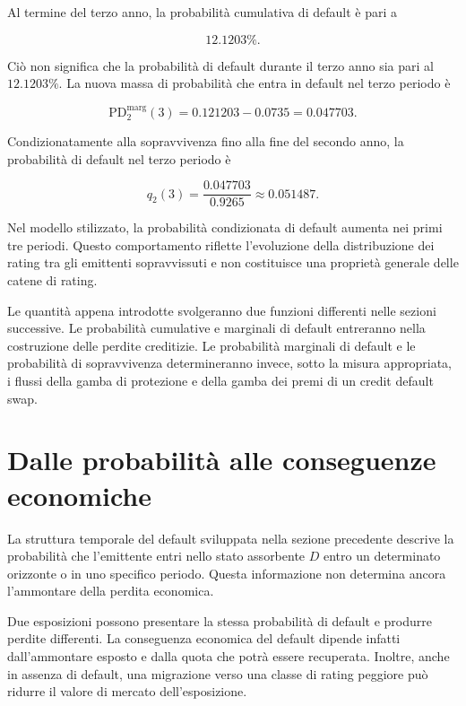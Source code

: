 Al termine del terzo anno, la probabilit\`{a} cumulativa di default
\`{e} pari a

\[
12.1203\%.
\]

Ci\`{o} non significa che la probabilit\`{a} di default durante il
terzo anno sia pari al $12.1203\%$. La nuova massa di probabilit\`{a}
che entra in default nel terzo periodo \`{e}

\[
\mathrm{PD}_{2}^{\mathrm{marg}}(3)
=
0.121203-0.0735
=
0.047703.
\]

Condizionatamente alla sopravvivenza fino alla fine del secondo anno,
la probabilit\`{a} di default nel terzo periodo \`{e}

\[
q_2(3)
=
\frac{0.047703}{0.9265}
\approx
0.051487.
\]

Nel modello stilizzato, la probabilit\`{a} condizionata di default
aumenta nei primi tre periodi. Questo comportamento riflette
l'evoluzione della distribuzione dei rating tra gli emittenti
sopravvissuti e non costituisce una propriet\`{a} generale delle
catene di rating.

Le quantit\`{a} appena introdotte svolgeranno due funzioni differenti
nelle sezioni successive. Le probabilit\`{a} cumulative e marginali di
default entreranno nella costruzione delle perdite creditizie. Le
probabilit\`{a} marginali di default e le probabilit\`{a} di
sopravvivenza determineranno invece, sotto la misura appropriata, i
flussi della gamba di protezione e della gamba dei premi di un credit
default swap.

\section{Dalle probabilit\`{a} alle conseguenze economiche}

\label{sec:cap9-conseguenze-economiche}

La struttura temporale del default sviluppata nella sezione precedente
descrive la probabilit\`{a} che l'emittente entri nello stato
assorbente $D$ entro un determinato orizzonte o in uno specifico
periodo. Questa informazione non determina ancora l'ammontare della
perdita economica.

Due esposizioni possono presentare la stessa probabilit\`{a} di
default e produrre perdite differenti. La conseguenza economica del
default dipende infatti dall'ammontare esposto e dalla quota che
potr\`{a} essere recuperata. Inoltre, anche in assenza di default, una
migrazione verso una classe di rating peggiore pu\`{o} ridurre il
valore di mercato dell'esposizione.

